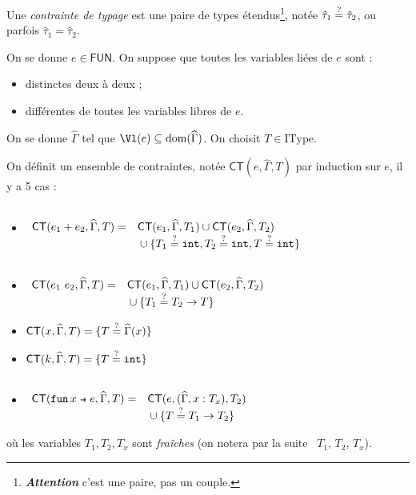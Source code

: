 \documentclass[../main]{subfiles}
\begin{document}
  \begin{defn}
    Une \textit{contrainte de typage} est une paire de types étendus\footnote{\textit{\textbf{Attention}} c'est une paire, pas un couple.}, notée $\hat{\tau}_1 \mathrel{\overset ? =} \hat{\tau}_2$, ou parfois $\hat{\tau}_1 = \hat{\tau}_2$.

    On se donne $e \in \mathsf{FUN}$. On suppose que toutes les variables liées de $e$ sont :
    \begin{itemize}
      \item distinctes deux à deux ;
      \item différentes de toutes les variables libres de $e$.
    \end{itemize}

    On se donne $\widehat{\Gamma}$ tel que $\Vl(e) \subseteq \mathrm{dom}(\widehat{\Gamma})$.
    On choisit $T \in \mathrm{IType}$.

    On définit un ensemble de contraintes, notée $\mathsf{CT}(e, \widehat{\Gamma}, T)$ par induction sur $e$, il y a 5 cas :
    \begin{itemize}
      \item $\begin{array}{rl}\\
          \mathsf{CT}(e_1 + e_2, \widehat{\Gamma}, T) =& \mathsf{CT}(e_1, \widehat{\Gamma}, T_1) \cup \mathsf{CT}(e_2, \widehat{\Gamma}, T_2)\\ &{}\cup \{T_1 \mathrel{\overset ? =} \texttt{int}, T_2 \mathrel{\overset ? =} \texttt{int}, T \mathrel{\overset ? =} \texttt{int}\} 
        \end{array}$
      \item $\begin{array}{rl}\\
          \mathsf{CT}(e_1\ e_2, \widehat{\Gamma}, T) =& \mathsf{CT}(e_1, \widehat{\Gamma}, T_1) \cup \mathsf{CT}(e_2, \widehat{\Gamma}, T_2)\\ &{}\cup \{T_1 \mathrel{\overset ? =} T_2 \to T\} 
        \end{array}$
      \item $\mathsf{CT}(x, \widehat{\Gamma}, T) = \{T \mathrel{\overset ? =} \widehat{\Gamma}(x)\}$ 
      \item $\mathsf{CT}(k, \widehat{\Gamma}, T) = \{T \mathrel{\overset ? =} \texttt{int}\}$ 
      \item $\begin{array}{rl}\\
          \mathsf{CT}(\fun x e, \widehat{\Gamma}, T) =& \mathsf{CT}(e, (\widehat{\Gamma}, x: T_x), T_2)\\ &{}\cup \{T \qeq T_1 \to T_2\} 
        \end{array}$
    \end{itemize}
    où les variables $T_1, T_2, T_x$ sont \textit{fraîches} (on notera par la suite \fresh\ $T_1$, $T_2$, $T_x$).
  \end{defn}
\end{document}
